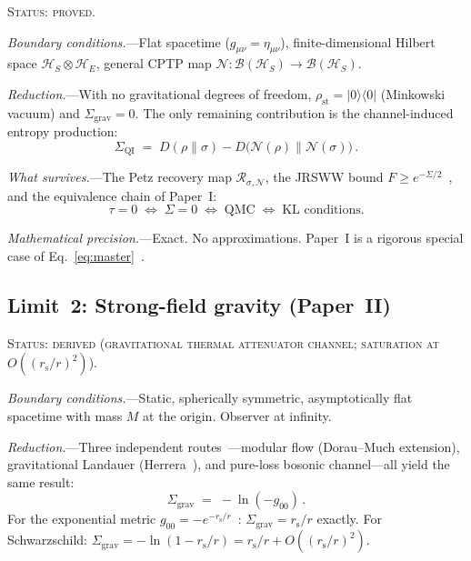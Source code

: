 \documentclass[prd,twocolumn,superscriptaddress,longbibliography,floatfix]{revtex4-2}
\newcommand{\Petz}{\mathcal{R}}
\newcommand{\chan}{\mathcal{N}}
\newcommand{\hilb}{\mathcal{H}}
\newcommand{\KL}{D}
\newcommand{\tauasym}{\tau}
\newcommand{\rs}{r_{\mathrm{s}}}
\newcommand{\Sgrav}{\Sigma_{\mathrm{grav}}}
\newcommand{\rhost}{\rho_{\mathrm{st}}}
\begin{document}
\textsc{Status: proved.}

\emph{Boundary conditions.}---Flat spacetime
($g_{\mu\nu} = \eta_{\mu\nu}$), finite-dimensional Hilbert
space $\hilb_S \otimes \hilb_E$, general CPTP map
$\chan: \mathcal{B}(\hilb_S) \to \mathcal{B}(\hilb_S)$.

\emph{Reduction.}---With no gravitational degrees of freedom,
$\rhost = |0\rangle\langle 0|$ (Minkowski vacuum) and
$\Sigma_{\mathrm{grav}} = 0$.  The only remaining
contribution is the channel-induced entropy production:
\begin{equation}
\Sigma_{\mathrm{QI}} \;=\;
\KL(\rho\|\sigma) - \KL\!\bigl(\chan(\rho)\|\chan(\sigma)\bigr)\,.
\label{eq:sigma_QI}
\end{equation}

\emph{What survives.}---The Petz recovery map
$\Petz_{\sigma,\chan}$, the JRSWW bound
$F \geq e^{-\Sigma/2}$~\cite{JRSWW2018,Fawzi2015},
and the equivalence chain of Paper~I:
\begin{equation}
\tauasym = 0
\;\Leftrightarrow\; \Sigma = 0
\;\Leftrightarrow\; \text{QMC}
\;\Leftrightarrow\; \text{KL conditions.}
\label{eq:equiv_chain}
\end{equation}

\emph{Mathematical precision.}---Exact.  No approximations.
Paper~I is a rigorous special case of
Eq.~\eqref{eq:master}~\cite{Paper1}.


\subsection{Limit~2: Strong-field gravity (Paper~II)}
\label{sec:limit_gravity}

\textsc{Status: derived (gravitational thermal attenuator
channel; saturation at $O((\rs/r)^2)$).}

\emph{Boundary conditions.}---Static, spherically symmetric,
asymptotically flat spacetime with mass $M$ at the origin.
Observer at infinity.

\emph{Reduction.}---Three independent
routes~\cite{Paper2}---modular flow
(Dorau--Much extension), gravitational Landauer
(Herrera~\cite{Herrera2020}), and pure-loss bosonic
channel---all yield the same result:
\begin{equation}
\Sgrav \;=\; -\ln(-g_{00})\,.
\label{eq:Sgrav}
\end{equation}
For the exponential metric
$g_{00} = -e^{-\rs/r}$~\cite{Yilmaz1958}:
$\Sgrav = \rs/r$ exactly.  For Schwarzschild:
$\Sgrav = -\ln(1 - \rs/r) = \rs/r + O((\rs/r)^2)$.
\end{document}
